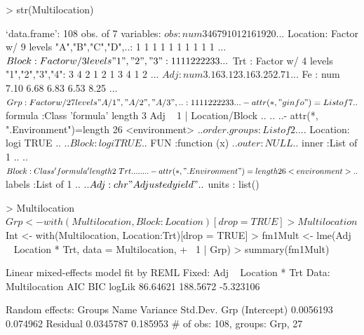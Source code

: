\documentclass[12pt]{article}
\begin{document}
\begin{Schunk}
\begin{Sinput}
> str(Multilocation)
\end{Sinput}
\begin{Soutput}
`data.frame':	108 obs. of  7 variables:
 $ obs     : num  3 4 6 7 9 10 12 16 19 20 ...
 $ Location: Factor w/ 9 levels "A","B","C","D",..: 1 1 1 1 1 1 1 1 1 1 ...
 $ Block   : Factor w/ 3 levels "1","2","3": 1 1 1 1 2 2 2 2 3 3 ...
 $ Trt     : Factor w/ 4 levels "1","2","3","4": 3 4 2 1 2 1 3 4 1 2 ...
 $ Adj     : num  3.16 3.12 3.16 3.25 2.71 ...
 $ Fe      : num  7.10 6.68 6.83 6.53 8.25 ...
 $ Grp     : Factor w/ 27 levels "A/1","A/2","A/3",..: 1 1 1 1 2 2 2 2 3 3 ...
 - attr(*, "ginfo")=List of 7
  ..$ formula     :Class 'formula' length 3 Adj ~ 1 | Location/Block
  .. .. ..- attr(*, ".Environment")=length 26 <environment> 
  ..$ order.groups:List of 2
  .. ..$ Location: logi TRUE
  .. ..$ Block   : logi TRUE
  ..$ FUN         :function (x)  
  ..$ outer       : NULL
  ..$ inner       :List of 1
  .. ..$ Block:Class 'formula' length 2 ~Trt
  .. .. .. ..- attr(*, ".Environment")=length 26 <environment> 
  ..$ labels      :List of 1
  .. ..$ Adj: chr "Adjusted yield"
  ..$ units       : list()
\end{Soutput}
\begin{Sinput}
> Multilocation$Grp <- with(Multilocation, Block:Location)[drop = TRUE]
> Multilocation$Int <- with(Multilocation, Location:Trt)[drop = TRUE]
> fm1Mult <- lme(Adj ~ Location * Trt, data = Multilocation, 
+     ~1 | Grp)
> summary(fm1Mult)
\end{Sinput}
\begin{Soutput}
Linear mixed-effects model fit by REML
Fixed: Adj ~ Location * Trt 
 Data: Multilocation 
      AIC      BIC    logLik
 86.64621 188.5672 -5.323106

Random effects:
 Groups   Name        Variance  Std.Dev.
 Grp      (Intercept) 0.0056193 0.074962
 Residual             0.0345787 0.185953
# of obs: 108, groups: Grp, 27


\end{Soutput}
\end{Schunk}
\end{document}
